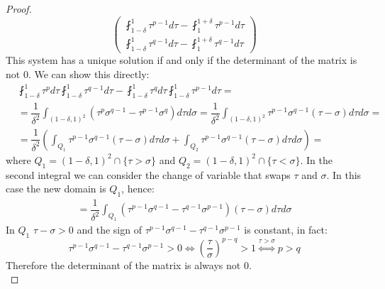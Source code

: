 \documentclass[corpo=11pt, stile=classica, tipotesi=custom,
greek, evenboxes, english]{toptesi}
\numberwithin{equation}{chapter}
\begin{document}
\begin{proof}
\begin{equation}
\begin{pmatrix}
		\fint_{1-\delta}^1 \tau^{p-1} d\tau - \fint_1^{1+\delta} \tau^{p-1} d\tau\\
		\fint_{1-\delta}^1 \tau^{q-1} d\tau - \fint_1^{1+\delta} \tau^{q-1} d\tau
	\end{pmatrix}
\end{equation}
{\color{blue}This system has a unique solution if and only if the determinant of the matrix is not 0. We can show this directly:
\begin{align*}
	& \fint_{1-\delta}^1 \tau^{p} d\tau \fint_{1-\delta}^1 \tau^{q-1} d\tau - \fint_{1-\delta}^1 \tau^{q} d\tau \fint_{1-\delta}^1 \tau^{p-1} d\tau=\\
	&= \dfrac{1}{\delta^2} \int_{(1-\delta,1)^2} \left(\tau^p \sigma^{q-1} - \tau^{p-1}\sigma^q\right) d\tau d\sigma = \dfrac{1}{\delta^2} \int_{(1-\delta,1)^2} \tau^{p-1} \sigma^{q-1} \left( \tau - \sigma \right) d\tau d\sigma = \\
	&= \dfrac{1}{\delta^2} \left( \int_{Q_1} \tau^{p-1} \sigma^{q-1} \left( \tau - \sigma \right) d\tau d\sigma + \int_{Q_2} \tau^{p-1} \sigma^{q-1} \left( \tau - \sigma \right) d\tau d\sigma \right)=
\end{align*}
where $Q_1=(1-\delta,1)^2 \cap \{\tau > \sigma\}$ and $Q_2=(1-\delta,1)^2 \cap \{\tau < \sigma\}$. In the second integral we can consider the change of variable that swaps $\tau$ and $\sigma$. In this case the new domain is $Q_1$, hence:
\begin{align*}
	= \dfrac{1}{\delta^2} \int_{Q_1} \left(\tau^{p-1}\sigma^{q-1} - \tau^{q-1}\sigma^{p-1}\right) \left(\tau - \sigma\right) d\tau d\sigma
\end{align*}
In $Q_1$ $\tau - \sigma > 0$ and the sign of $\tau^{p-1}\sigma^{q-1} - \tau^{q-1}\sigma^{p-1}$ is constant, in fact:
\begin{equation*}
	\tau^{p-1}\sigma^{q-1} - \tau^{q-1}\sigma^{p-1} > 0 \iff \left(\dfrac{\tau}{\sigma}\right)^{p-q} > 1 \overset{\tau > \sigma}{\iff} p>q
\end{equation*}
Therefore the determinant of the matrix is always not 0.}\\

\end{proof}
\end{document}
